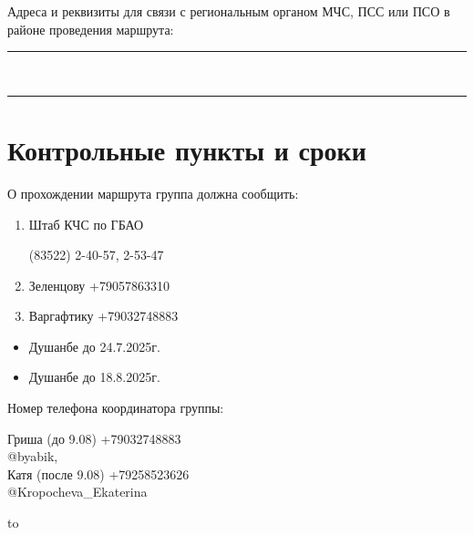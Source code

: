 \documentclass[a5paper, 12pt, twoside]{article}
\begin{document}
        Адреса и реквизиты для связи с региональным органом МЧС, ПСС или ПСО в районе проведения маршрута:%
        \;\leaders\hrule height 0.2pt\hfill\strut
        \vspace{0.2cm}

        \,\leaders\hrule height 0.2pt\hfill\strut
        \vspace{0.2cm}

\newpage %

    \section{Контрольные пункты и сроки}

        О прохождении маршрута группа должна сообщить:

        \begin{enumerate}[itemsep=1pt]
            \item \parbox[t]{0.58\textwidth}{%
            Штаб КЧС по ГБАО} \hfil \parbox[t]{0.325\textwidth}{\raggedleft(83522) 2-40-57, 2-53-47}
            \item Зеленцову \hfill +79057863310
\item Варгафтику \hfill +79032748883

        \end{enumerate}

        \begin{itemize}[label=из, noitemsep]
            \item Душанбе до 24.7.2025\;г.
            \item Душанбе до 18.8.2025\;г.
        \end{itemize}

        \parbox[t]{0.4\textwidth}{\raggedright Номер телефона координатора группы:} \hfil \parbox[t]{0.5\textwidth}{\raggedleft Гриша (до 9.08) +79032748883 \\ @byabik,\\\vspace{0.2cm} Катя (после 9.08) +79258523626 \\ @Kropocheva\_Ekaterina}
        \vspace{0.4cm}

        \hbox to 
        \vspace{0.4cm}
\end{document}
